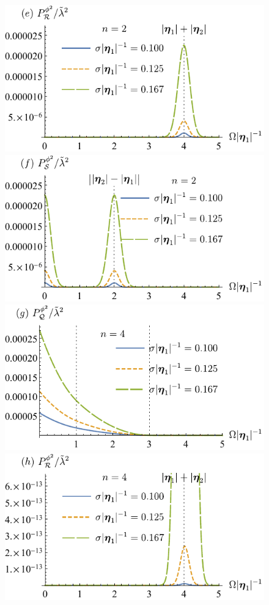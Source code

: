 \documentclass[prd,twocolumn,superscriptaddress,nofootinbib,floatfix,amsmath,amssymb]{revtex4-2}
\begin{document}
\begin{figure}[tp]
        \includegraphics[scale=0.64]{Fig6e.pdf}
        \includegraphics[scale=0.64]{Fig6f.pdf}
        \includegraphics[scale=0.64]{Fig6g.pdf}
        \includegraphics[scale=0.64]{Fig6h.pdf}

\end{figure}
\end{document}
